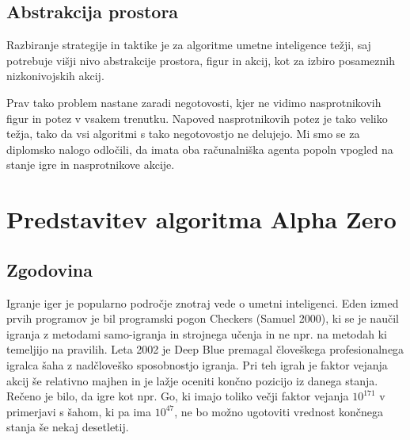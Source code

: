 \documentclass[a4paper, 12pt]{book}
\begin{document}
\section{Abstrakcija prostora}
Razbiranje strategije in taktike je za algoritme umetne inteligence težji, saj potrebuje višji nivo abstrakcije prostora, figur in akcij, kot za izbiro posameznih nizkonivojskih akcij.

Prav tako problem nastane zaradi negotovosti, kjer ne vidimo nasprotnikovih figur in potez v vsakem trenutku. 
Napoved nasprotnikovih potez je tako veliko težja, tako da vsi algoritmi s tako negotovostjo ne delujejo.
Mi smo se za diplomsko nalogo odločili, da imata oba računalniška agenta popoln vpogled na stanje igre in nasprotnikove akcije.




\chapter{Predstavitev algoritma Alpha Zero}
\label{alphazero}
\section{Zgodovina}

Igranje iger je popularno področje znotraj vede o umetni inteligenci. Eden izmed prvih programov je bil programski pogon Checkers (Samuel 2000), ki se je naučil igranja z metodami samo-igranja in strojnega učenja in ne npr. na metodah ki temeljijo na pravilih.
Leta 2002 je Deep Blue premagal človeškega profesionalnega igralca šaha z nadčloveško sposobnostjo igranja. Pri teh igrah je faktor vejanja akcij še relativno majhen in je lažje oceniti končno pozicijo iz danega stanja.
Rečeno je bilo, da igre kot npr. Go, ki imajo toliko večji faktor vejanja $10^{171}$ v primerjavi s šahom, ki pa ima $10^{47}$, ne bo možno ugotoviti vrednost končnega stanja še nekaj desetletij.
\end{document}
